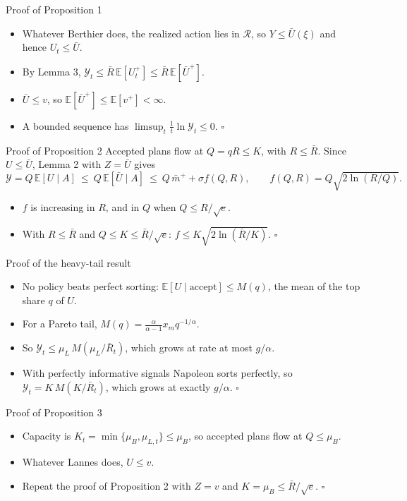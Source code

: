 \documentclass[aspectratio=169,11pt,t]{beamer}
\newcommand{\Lan}{\textcolor{lan}{Lannes}}
\newcommand{\E}{\mathbb{E}}
\newcommand{\Ycal}{\mathcal{Y}}
\begin{document}
\begin{frame}{Proof of Proposition 1}
  \begin{itemize}\setlength{\itemsep}{8pt}
    \item Whatever Berthier does, the realized action lies in $\mathcal{R}$, so $Y\le\bar U(\xi)$ and hence $U_t\le\bar U$.
    \item By Lemma 3, $\Ycal_t\le\bar R\,\E[U_t^+]\le\bar R\,\E[\bar U^+]$.
    \item $\bar U\le v$, so $\E[\bar U^+]\le\E[v^+]<\infty$.
    \item A bounded sequence has $\limsup_t\tfrac1t\ln\Ycal_t\le0$. \hfill$\square$
  \end{itemize}
\end{frame}

\begin{frame}{Proof of Proposition 2}
  Accepted plans flow at $Q=qR\le K$, with $R\le\bar R$. Since $U\le\bar U$, Lemma 2 with $Z=\bar U$ gives
  \[\Ycal=Q\,\E[U\mid A]\ \le\ Q\,\E[\bar U\mid A]\ \le\ Q\,\bar m^++\sigma f(Q,R),\qquad f(Q,R)=Q\sqrt{2\ln(R/Q)}.\]
  \begin{itemize}\setlength{\itemsep}{6pt}
    \item $f$ is increasing in $R$, and in $Q$ when $Q\le R/\sqrt e$.
    \item With $R\le\bar R$ and $Q\le K\le\bar R/\sqrt e$: $f\le K\sqrt{2\ln(\bar R/K)}$. \hfill$\square$
  \end{itemize}
\end{frame}

\begin{frame}{Proof of the heavy-tail result}
  \begin{itemize}\setlength{\itemsep}{8pt}
    \item No policy beats perfect sorting: $\E[U\mid\text{accept}]\le M(q)$, the mean of the top share $q$ of $U$.
    \item For a Pareto tail, $M(q)=\tfrac{\alpha}{\alpha-1}x_mq^{-1/\alpha}$.
    \item So $\Ycal_t\le\mu_L\,M(\mu_L/\bar R_t)$, which grows at rate at most $g/\alpha$.
    \item With perfectly informative signals Napoleon sorts perfectly, so $\Ycal_t=K\,M(K/\bar R_t)$, which grows at exactly $g/\alpha$. \hfill$\square$
  \end{itemize}
\end{frame}

\begin{frame}{Proof of Proposition 3}
  \begin{itemize}\setlength{\itemsep}{8pt}
    \item Capacity is $K_t=\min\{\mu_B,\mu_{L,t}\}\le\mu_B$, so accepted plans flow at $Q\le\mu_B$.
    \item Whatever \Lan{} does, $U\le v$.
    \item Repeat the proof of Proposition 2 with $Z=v$ and $K=\mu_B\le\bar R/\sqrt e$. \hfill$\square$
  \end{itemize}
\end{frame}
\end{document}
